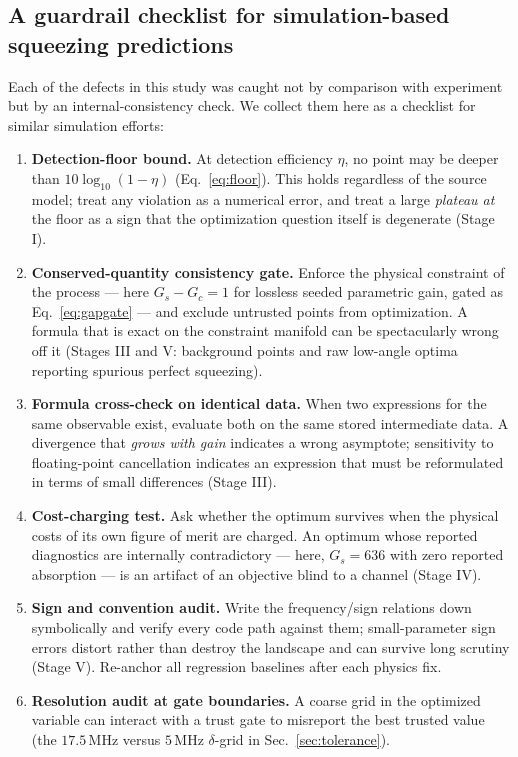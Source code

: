 \documentclass[11pt,a4paper]{article}
\newcommand{\MHz}{\,\mathrm{MHz}}
\begin{document}
\subsection{A guardrail checklist for simulation-based squeezing predictions}
Each of the defects in this study was caught not by comparison with
experiment but by an internal-consistency check. We collect them here as a
checklist for similar simulation efforts:
\begin{enumerate}[nosep]
\item \textbf{Detection-floor bound.} At detection efficiency $\eta$, no
      point may be deeper than $10\log_{10}(1-\eta)$
      (Eq.~\eqref{eq:floor}). This holds regardless of the source model;
      treat any violation as a numerical error, and treat a large
      \emph{plateau at} the floor as a sign that the optimization question
      itself is degenerate (Stage I).
\item \textbf{Conserved-quantity consistency gate.} Enforce the physical
      constraint of the process --- here $G_s-G_c=1$ for lossless seeded
      parametric gain, gated as Eq.~\eqref{eq:gapgate} --- and exclude
      untrusted points from optimization. A formula that is exact on the
      constraint manifold can be spectacularly wrong off it (Stages III and
      V: background points and raw low-angle optima reporting spurious
      perfect squeezing).
\item \textbf{Formula cross-check on identical data.} When two expressions
      for the same observable exist, evaluate both on the same stored
      intermediate data. A divergence that \emph{grows with gain} indicates
      a wrong asymptote; sensitivity to floating-point cancellation
      indicates an expression that must be reformulated in terms of small
      differences (Stage III).
\item \textbf{Cost-charging test.} Ask whether the optimum survives when
      the physical costs of its own figure of merit are charged. An optimum
      whose reported diagnostics are internally contradictory --- here,
      $G_s=636$ with zero reported absorption --- is an artifact of an
      objective blind to a channel (Stage IV).
\item \textbf{Sign and convention audit.} Write the frequency/sign
      relations down symbolically and verify every code path against them;
      small-parameter sign errors distort rather than destroy the landscape
      and can survive long scrutiny (Stage V). Re-anchor all regression
      baselines after each physics fix.
\item \textbf{Resolution audit at gate boundaries.} A coarse grid in the
      optimized variable can interact with a trust gate to misreport the
      best trusted value (the $17.5\MHz$ versus $5\MHz$ $\delta$-grid in
      Sec.~\ref{sec:tolerance}).
\end{enumerate}
\end{document}
